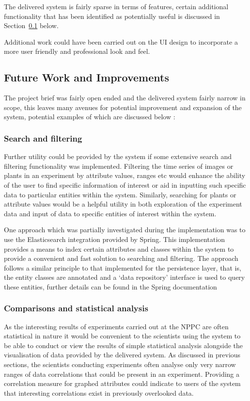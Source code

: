 The delivered system is fairly sparse in terms of features, certain additional functionality that has been identified as potentially useful is discussed in Section~\ref{improve} below.

Additional work could have been carried out on the UI design to incorporate a more user friendly and professional look and feel.





\subsection{Future Work and Improvements}\label{improve}

The project brief was fairly open ended and the delivered system fairly narrow in scope, this leaves many avenues for potential improvement and expansion of the system, potential examples of which are discussed  below :

\subsubsection{Search and filtering}
Further utility could be provided by the system if some extensive search and filtering functionality was implemented. Filtering the time series of images or plants in an experiment by attribute values, ranges etc would enhance the ability of the user to find specific information of interest or aid in inputting such specific data to particular entities within the system. Similarly, searching for plants or attribute values would be a helpful utility in both exploration of the experiment data and input of data to specific entities of interest within the system.

One approach which was partially investigated during the implementation was to use the Elasticsearch\cite{elastic} integration provided by Spring. This implementation provides a means to index certain attributes and classes within the system to provide a convenient and fast solution to searching and filtering. The approach follows a similar principle to that implemented for the persistence layer, that is, the entity classes are annotated and a `data repository' interface is used to query these entities, further details can be found in the Spring documentation\cite{_spelastic}  


\subsubsection{Comparisons and statistical analysis}
As the interesting results of experiments carried out at the NPPC are often statistical in nature it would be convenient to the scientists using the system to be able to conduct or view the results of simple statistical analysis alongside the visualisation of data provided by the delivered system. As discussed in previous sections, the scientists conducting experiments often analyse only very narrow ranges of data correlations that could be present in an experiment. Providing a correlation measure for graphed attributes could indicate to users of the system that interesting correlations exist in previously overlooked data. 

